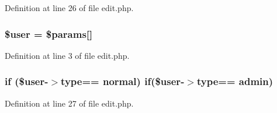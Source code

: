 Definition at line 26 of file edit.\+php.

\subsubsection[{\texorpdfstring{\$user}{$user}}]{\setlength{\rightskip}{0pt plus 5cm}\${\bf user} = \$params\mbox{[}\textquotesingle{}\mbox{]}}\hypertarget{system_2plugins_2default_2forms_2admin_2user_2edit_8php_a598ca4e71b15a1313ec95f0df1027ca5}{}\label{system_2plugins_2default_2forms_2admin_2user_2edit_8php_a598ca4e71b15a1313ec95f0df1027ca5}


Definition at line 3 of file edit.\+php.

\subsubsection[{\texorpdfstring{if}{if}}]{\setlength{\rightskip}{0pt plus 5cm}if (\${\bf user}-\/$>${\bf type}== \textquotesingle{}normal\textquotesingle{}) if(\${\bf user}-\/$>${\bf type}== \textquotesingle{}admin\textquotesingle{})}\hypertarget{system_2plugins_2default_2forms_2admin_2user_2edit_8php_a8f8f961f5c31273010ec545b33c635b2}{}\label{system_2plugins_2default_2forms_2admin_2user_2edit_8php_a8f8f961f5c31273010ec545b33c635b2}


Definition at line 27 of file edit.\+php.


